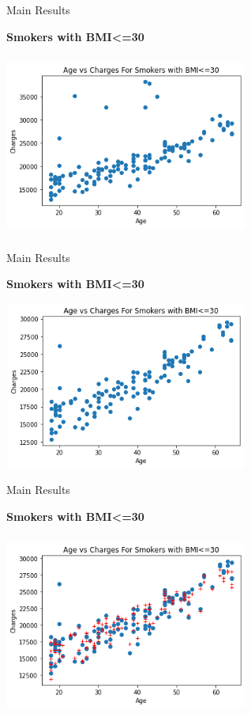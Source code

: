 \documentclass[handout,9pt]{beamer}
\numberwithin{theorem}{section}
\begin{document}
\begin{frame}{Main Results}
	\begin{spacing}{1}
		\textbf{Smokers with BMI<=30}
		\begin{center}
			\includegraphics[height=6cm, width=8cm]{work11}
		\end{center}
	\end{spacing}
\end{frame}

\begin{frame}{Main Results}
	\begin{spacing}{1}
		\textbf{Smokers with BMI<=30}
		\begin{center}
			\includegraphics[height=5.5cm, width=8cm]{work12}
		\end{center}
	\hspace{3.5cm}{Correlation between Age and Charges = 0.8623745}
	\end{spacing}
\end{frame}

\begin{frame}{Main Results}
	\begin{spacing}{1}
		\textbf{Smokers with BMI<=30}
		\begin{center}
			\includegraphics[height=6cm, width=8cm]{work14}
		\end{center}
	\end{spacing}
\end{frame}
\end{document}
